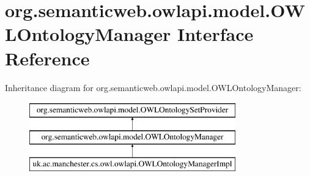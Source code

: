 \hypertarget{interfaceorg_1_1semanticweb_1_1owlapi_1_1model_1_1_o_w_l_ontology_manager}{\section{org.\-semanticweb.\-owlapi.\-model.\-O\-W\-L\-Ontology\-Manager Interface Reference}
\label{interfaceorg_1_1semanticweb_1_1owlapi_1_1model_1_1_o_w_l_ontology_manager}
}
Inheritance diagram for org.\-semanticweb.\-owlapi.\-model.\-O\-W\-L\-Ontology\-Manager\-:\begin{figure}[H]
\begin{center}
\leavevmode
\includegraphics[height=3.000000cm]{interfaceorg_1_1semanticweb_1_1owlapi_1_1model_1_1_o_w_l_ontology_manager}
\end{center}
\end{figure}
